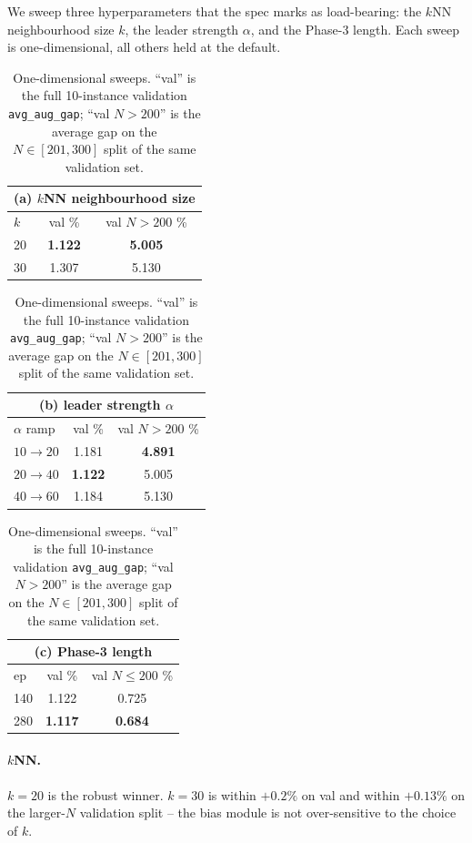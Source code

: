 \documentclass[11pt,a4paper]{article}
\begin{document}
We sweep three hyperparameters that the spec marks as load-bearing:
the $k$NN neighbourhood size $k$, the leader strength $\alpha$, and the
Phase-3 length. Each sweep is one-dimensional, all others held at the
default.

\begin{table}[t]
\centering
\caption{One-dimensional sweeps. ``val'' is the full 10-instance
validation \texttt{avg\_aug\_gap}; ``val $N>200$'' is the average gap on
the $N\!\in\![201,300]$ split of the same validation set.}
\label{tab:sens}
\small
\begin{tabular}{l c c}
\toprule
\multicolumn{3}{c}{\textbf{(a) $k$NN neighbourhood size}}\\
\midrule
$k$ & val \% & val $N>200$ \% \\
\midrule
20  & \textbf{1.122} & \textbf{5.005} \\
30  & 1.307         & 5.130 \\
\bottomrule
\end{tabular}
\quad
\begin{tabular}{l c c}
\toprule
\multicolumn{3}{c}{\textbf{(b) leader strength $\alpha$}}\\
\midrule
$\alpha$ ramp        & val \% & val $N>200$ \% \\
\midrule
$10\!\to\!20$        & 1.181  & \textbf{4.891} \\
$20\!\to\!40$        & \textbf{1.122}  & 5.005 \\
$40\!\to\!60$        & 1.184  & 5.130 \\
\bottomrule
\end{tabular}
\quad
\begin{tabular}{l c c}
\toprule
\multicolumn{3}{c}{\textbf{(c) Phase-3 length}}\\
\midrule
ep   & val \% & val $N\!\le\!200$ \% \\
\midrule
140  & 1.122  & 0.725 \\
280  & \textbf{1.117}  & \textbf{0.684} \\
\bottomrule
\end{tabular}
\end{table}

\paragraph{$k$NN.} $k=20$ is the robust winner. $k=30$ is within
$+0.2\%$ on val and within $+0.13\%$ on the larger-$N$ validation split
-- the bias module is not over-sensitive to the choice of $k$.
\end{document}
